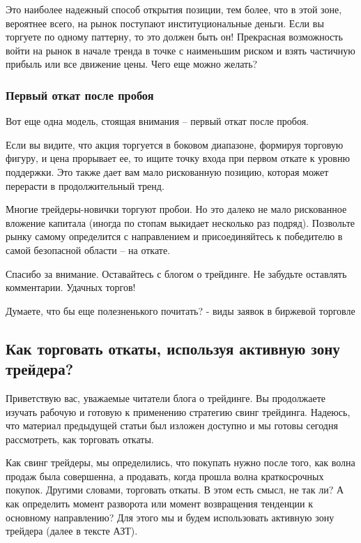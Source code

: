 \documentclass{book}
\begin{document}
Это наиболее надежный способ открытия позиции, тем более, что в этой
зоне, вероятнее всего, на рынок поступают институциональные
деньги. Если вы торгуете по одному паттерну, то это должен быть он!
Прекрасная возможность войти на рынок в начале тренда в точке с
наименьшим риском и взять частичную прибыль или все движение
цены. Чего еще можно желать?

\subsubsection{Первый откат после пробоя}

Вот еще одна модель, стоящая внимания – первый откат после пробоя.

Если вы видите, что акция торгуется в боковом диапазоне, формируя торговую фигуру, и цена прорывает ее, то ищите точку входа при первом откате к уровню поддержки. Это также дает вам мало рискованную позицию, которая может перерасти в продолжительный тренд.

Многие трейдеры-новички торгуют пробои. Но это далеко не мало рискованное вложение капитала (иногда по стопам выкидает несколько раз подряд). Позвольте рынку самому определится с направлением и присоединяйтесь к победителю в самой безопасной области – на откате.

Спасибо за внимание. Оставайтесь с блогом  о трейдинге. Не забудьте оставлять комментарии. Удачных торгов!


Думаете, что бы еще полезненького почитать? - виды заявок в биржевой
торговле

\subsection{Как торговать откаты, используя активную зону трейдера?}

Приветствую вас, уважаемые читатели блога о трейдинге. Вы продолжаете изучать рабочую и готовую к применению стратегию свинг трейдинга. Надеюсь, что материал предыдущей статьи был изложен доступно и мы готовы сегодня рассмотреть, как торговать откаты.

Как свинг трейдеры, мы определились, что покупать нужно после того,
как волна продаж была совершенна, а продавать, когда прошла волна
краткосрочных покупок. Другими словами, торговать откаты. В этом есть
смысл, не так ли? А как определить момент разворота или момент
возвращения тенденции к основному направлению? Для этого мы и будем
использовать активную зону трейдера (далее в тексте АЗТ).
\end{document}
